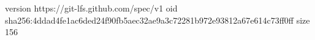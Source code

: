 version https://git-lfs.github.com/spec/v1
oid sha256:4ddad4fe1ac6ded24f90fb5aec32ae9a3c72281b972e93812a67e614c73ff0ff
size 156
